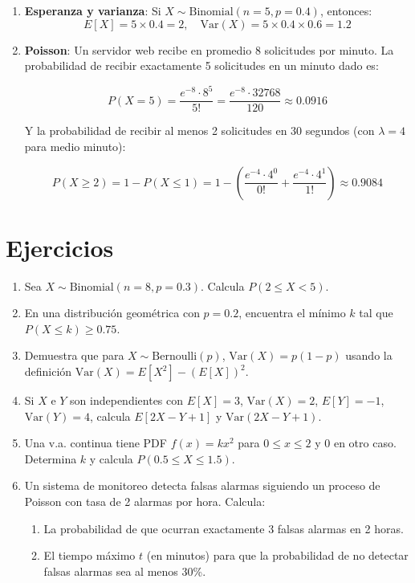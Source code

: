 \documentclass[letterpaper, 12pt]{article}
\begin{document}
\begin{enumerate}
		\item \textbf{Esperanza y varianza}: Si $X \sim \text{Binomial}(n=5, p=0.4)$, entonces:
		\[ E[X] = 5 \times 0.4 = 2, \quad \text{Var}(X) = 5 \times 0.4 \times 0.6 = 1.2 \]
		
		\item \textbf{Poisson}: Un servidor web recibe en promedio 8 solicitudes por minuto. La probabilidad de recibir exactamente 5 solicitudes en un minuto dado es:
		
		\[
		P(X = 5) = \frac{e^{-8} \cdot 8^5}{5!} = \frac{e^{-8} \cdot 32768}{120} \approx 0.0916
		\]
		
		Y la probabilidad de recibir al menos 2 solicitudes en 30 segundos (con $\lambda = 4$ para medio minuto):
		
		\[
		P(X \geq 2) = 1 - P(X \leq 1) = 1 - \left( \frac{e^{-4} \cdot 4^0}{0!} + \frac{e^{-4} \cdot 4^1}{1!} \right) \approx 0.9084
		\]
		
	\end{enumerate}
	
	\section{Ejercicios}
	
	\begin{enumerate}
		\item Sea $X \sim \text{Binomial}(n=8, p=0.3)$. Calcula $P(2 \leq X < 5)$.
		
		\item En una distribución geométrica con $p=0.2$, encuentra el mínimo $k$ tal que $P(X \leq k) \geq 0.75$.
		
		\item Demuestra que para $X \sim \text{Bernoulli}(p)$, $\text{Var}(X) = p(1-p)$ usando la definición $\text{Var}(X) = E[X^2] - (E[X])^2$.
		
		\item Si $X$ e $Y$ son independientes con $E[X] = 3$, $\text{Var}(X) = 2$, $E[Y] = -1$, $\text{Var}(Y) = 4$, calcula $E[2X - Y + 1]$ y $\text{Var}(2X - Y + 1)$.
		
		\item Una v.a. continua tiene PDF $f(x) = kx^2$ para $0 \leq x \leq 2$ y 0 en otro caso. Determina $k$ y calcula $P(0.5 \leq X \leq 1.5)$.
		
		\item Un sistema de monitoreo detecta falsas alarmas siguiendo un proceso de Poisson con tasa de 2 alarmas por hora. Calcula:
		\begin{enumerate}
			\item La probabilidad de que ocurran exactamente 3 falsas alarmas en 2 horas.
			\item El tiempo máximo $t$ (en minutos) para que la probabilidad de no detectar falsas alarmas sea al menos 30\%.
		\end{enumerate}
	\end{enumerate}
	
\end{document}
